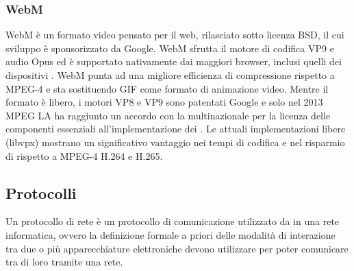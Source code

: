 		\subsubsection{WebM}
			WebM è un formato video  pensato per il web, rilasciato sotto licenza \gls{BSD}, il cui sviluppo è sponsorizzato da Google. WebM sfrutta il motore di codifica VP9 e audio Opus ed è supportato nativamente dai maggiori browser, inclusi quelli dei dispositivi . WebM punta ad una migliore efficienza di compressione rispetto a MPEG-4 e sta sostituendo \gls{GIF} come formato di animazione video. Mentre il formato è libero, i motori VP8 e VP9 sono patentati Google e solo nel 2013 \gls{MPEG} LA ha raggiunto un accordo con la multinazionale per la licenza delle componenti essenziali all'implementazione dei . Le attuali implementazioni libere (libvpx) mostrano un significativo vantaggio nei tempi di codifica e nel risparmio di  rispetto a MPEG-4 H.264 e H.265.

	\subsection{Protocolli}
	Un protocollo di rete è un protocollo di comunicazione utilizzato da in una rete informatica, ovvero la definizione formale a priori delle modalità di interazione tra due o più apparecchiature elettroniche devono utilizzare per poter comunicare tra di loro tramite una rete.


